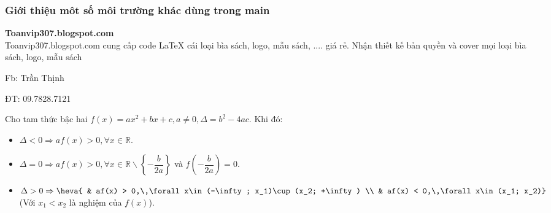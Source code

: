 \begin{tomtat}
\subsubsection{Giới thiệu môt số môi trường khác dùng trong main}
\lipsum[1]
\begin{note}
	{\bfseries Toanvip307.blogspot.com}\\
	Toanvip307.blogspot.com cung cấp code \LaTeX{} cái loại bìa sách, logo, mẫu sách, .... giá rẻ. Nhận thiết kế bản quyền và cover mọi loại bìa sách, logo, mẫu sách
	\begin{listEX}[2]
		\item Fb: Trần Thịnh
		\item ĐT: 09.7828.7121
	\end{listEX}
\end{note}

\begin{dl}
	Cho tam thức bậc hai $f(x)  =  ax^2  +  bx  +  c,a\ne 0,\Delta  =  b^2  -  4ac$.
	Khi đó:
	\begin{itemize}
		\item $\Delta  <  0\Rightarrow af(x)  >  0,\forall x\in \mathbb{R}$.
		\item $ \Delta  =  0\Rightarrow af(x)  >  0,\forall x\in \mathbb{R}\backslash \left\{ -  \dfrac{b}{2a}\right\} $ và $f\left(-\dfrac{b}{2a}\right)=0$.
		\item $ \Delta  >  0\Rightarrow \heva{
			& af(x)  >  0,\,\forall x\in (-\infty; x_1)\cup (x_2; +\infty) \\ 
			& af(x)  <  0,\,\forall x\in (x_1; x_2)}$ (Với $x_1<x_2$ là nghiệm của $f(x)$).
		\begin{center}
		\end{center}
	\end{itemize}	
\end{dl}


\end{tomtat}
